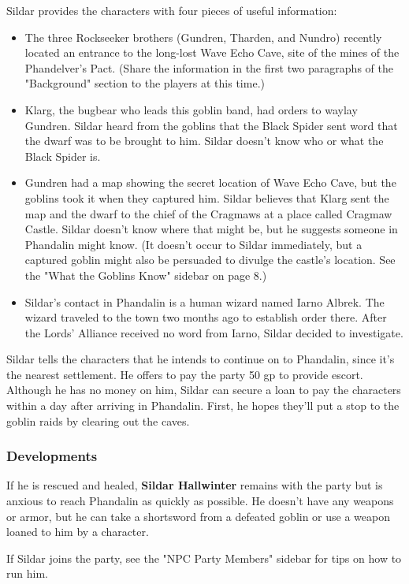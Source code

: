\documentclass[10pt,a4paper,twoside,bg=print,twocolumn,openany,nodeprecatedcode]{dndbook}
\begin{document}
Sildar provides the characters with four pieces of useful information:


\begin{itemize}
\item The three Rockseeker brothers (Gundren, Tharden, and Nundro) recently located an entrance to the long-lost Wave Echo Cave, site of the mines of the Phandelver's Pact. (Share the information in the first two paragraphs of the "Background" section to the players at this time.)
\item Klarg, the bugbear who leads this goblin band, had orders to waylay Gundren. Sildar heard from the goblins that the Black Spider sent word that the dwarf was to be brought to him. Sildar doesn't know who or what the Black Spider is.
\item Gundren had a map showing the secret location of Wave Echo Cave, but the goblins took it when they captured him. Sildar believes that Klarg sent the map and the dwarf to the chief of the Cragmaws at a place called Cragmaw Castle. Sildar doesn't know where that might be, but he suggests someone in Phandalin might know. (It doesn't occur to Sildar immediately, but a captured goblin might also be persuaded to divulge the castle's location. See the "What the Goblins Know" sidebar on page 8.)
\item Sildar's contact in Phandalin is a human wizard named Iarno Albrek. The wizard traveled to the town two months ago to establish order there. After the Lords' Alliance received no word from Iarno, Sildar decided to investigate.
\end{itemize}

Sildar tells the characters that he intends to continue on to Phandalin, since it's the nearest settlement. He offers to pay the party 50 gp to provide escort. Although he has no money on him, Sildar can secure a loan to pay the characters within a day after arriving in Phandalin. First, he hopes they'll put a stop to the goblin raids by clearing out the caves.

\subsubsection{Developments}
If he is rescued and healed, \textbf{Sildar Hallwinter} remains with the party but is anxious to reach Phandalin as quickly as possible. He doesn't have any weapons or armor, but he can take a shortsword from a defeated goblin or use a weapon loaned to him by a character.

If Sildar joins the party, see the "NPC Party Members" sidebar for tips on how to run him.
\end{document}
